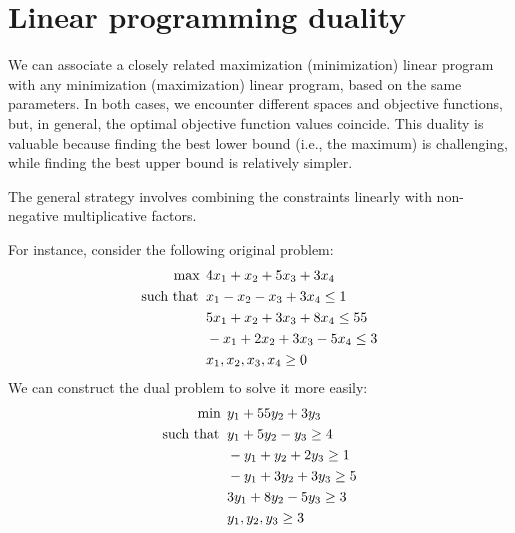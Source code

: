 \section{Linear programming duality}

We can associate a closely related maximization (minimization) linear program with any minimization (maximization) linear program, based on the same parameters.
In both cases, we encounter different spaces and objective functions, but, in general, the optimal objective function values coincide.
This duality is valuable because finding the best lower bound (i.e., the maximum) is challenging, while finding the best upper bound is relatively simpler.

The general strategy involves combining the constraints linearly with non-negative multiplicative factors.
\begin{example}
    For instance, consider the following original problem:
    \begin{align*}
        \max                      \:&\: 4x_1+x_2+5x_3+3x_4          \\
        \textnormal{such that }     &\: x_1-x_2-x_3+3x_4 \leq 1     \\
                                    &\: 5x_1+x_2+3x_3+8x_4 \leq 55  \\
                                    &\: -x_1+2x_2+3x_3-5x_4 \leq 3  \\
                                    &\: x_1,x_2,x_3,x_4 \geq 0      
    \end{align*}
    We can construct the dual problem to solve it more easily:
    \begin{align*}
        \min                      \:&\: y_1+55y_2+3y_3              \\
        \textnormal{such that }     &\: y_1+5y_2-y_3 \geq 4         \\
                                    &\: -y_1+y_2+2y_3 \geq 1        \\
                                    &\: -y_1+3y_2+3y_3 \geq 5       \\
                                    &\: 3y_1+8y_2-5y_3 \geq 3       \\   
                                    &\: y_1,y_2,y_3 \geq 3          \\
    \end{align*}
\end{example}